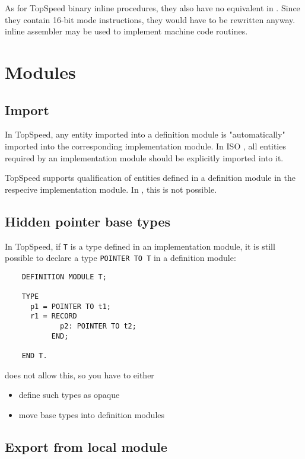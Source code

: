     As for TopSpeed binary inline procedures, they also have no equivalent 
    in \xds{}. Since they contain 16-bit mode instructions, they would have
    to be rewritten anyway. \xds{} inline assembler may be used to implement 
    machine code routines.

\section{Modules}

\subsection{Import}

    In TopSpeed, any entity imported into a definition module is "automatically" imported
    into the corresponding implementation module. In ISO \mt{}, all entities
    required by an implementation module should be explicitly imported into it.

    TopSpeed \mt{} supports qualification of entities defined in a definition
    module in the respecive implementation module. In \XDS{}, this is not 
    possible.

\subsection{Hidden pointer base types}

    In TopSpeed, if \verb'T' is a type defined in an implementation module,
    it is still possible to declare a type \verb'POINTER TO T' in a 
    definition module:

\begin{verbatim}
    DEFINITION MODULE T;
    
    TYPE 
      p1 = POINTER TO t1;
      r1 = RECORD
             p2: POINTER TO t2;
           END;
    
    END T.
\end{verbatim}

    \xds{} does not allow this, so you have to either
    \begin{itemize}
    \item define such types as opaque
    \item move base types into definition modules
    \end{itemize}

\subsection{Export from local module}

